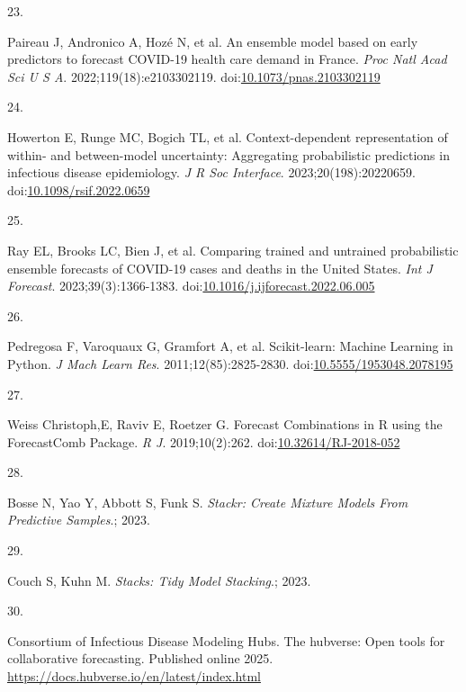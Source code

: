\documentclass[
]{article}
\newlength{\cslhangindent}
\newlength{\csllabelwidth}
\newenvironment{CSLReferences}[2] %
 {\begin{list}{}{%
  \setlength{\itemindent}{0pt}
  \setlength{\leftmargin}{0pt}
  \setlength{\parsep}{0pt}
  \ifodd #1
   \setlength{\leftmargin}{\cslhangindent}
   \setlength{\itemindent}{-1\cslhangindent}
  \fi
  \setlength{\itemsep}{#2\baselineskip}}}
 {\end{list}}
\newcommand{\CSLLeftMargin}[1]{\parbox[t]{\csllabelwidth}{\strut#1\strut}}
\newcommand{\CSLRightInline}[1]{\parbox[t]{\linewidth - \csllabelwidth}{\strut#1\strut}}
\begin{document}
\begin{CSLReferences}{0}{1}
\CSLLeftMargin{23. }%
\CSLRightInline{Paireau J, Andronico A, Hozé N, et al. An ensemble model
based on early predictors to forecast {COVID}-19 health care demand in
{France}. \emph{Proc Natl Acad Sci U S A}. 2022;119(18):e2103302119.
doi:\href{https://doi.org/10.1073/pnas.2103302119}{10.1073/pnas.2103302119}}

\CSLLeftMargin{24. }%
\CSLRightInline{Howerton E, Runge MC, Bogich TL, et al.
Context-dependent representation of within- and between-model
uncertainty: Aggregating probabilistic predictions in infectious disease
epidemiology. \emph{J R Soc Interface}. 2023;20(198):20220659.
doi:\href{https://doi.org/10.1098/rsif.2022.0659}{10.1098/rsif.2022.0659}}

\CSLLeftMargin{25. }%
\CSLRightInline{Ray EL, Brooks LC, Bien J, et al. Comparing trained and
untrained probabilistic ensemble forecasts of {COVID}-19 cases and
deaths in the {United} {States}. \emph{Int J Forecast}.
2023;39(3):1366-1383.
doi:\href{https://doi.org/10.1016/j.ijforecast.2022.06.005}{10.1016/j.ijforecast.2022.06.005}}

\CSLLeftMargin{26. }%
\CSLRightInline{Pedregosa F, Varoquaux G, Gramfort A, et al.
Scikit-learn: {Machine} {Learning} in {Python}. \emph{J Mach Learn Res}.
2011;12(85):2825-2830.
doi:\href{https://doi.org/10.5555/1953048.2078195}{10.5555/1953048.2078195}}

\CSLLeftMargin{27. }%
\CSLRightInline{Weiss Christoph,E, Raviv E, Roetzer G. Forecast
Combinations in R using the ForecastComb Package. \emph{R J}.
2019;10(2):262.
doi:\href{https://doi.org/10.32614/RJ-2018-052}{10.32614/RJ-2018-052}}

\CSLLeftMargin{28. }%
\CSLRightInline{Bosse N, Yao Y, Abbott S, Funk S. \emph{Stackr: {Create}
{Mixture} {Models} {From} {Predictive} {Samples}}.; 2023.}

\CSLLeftMargin{29. }%
\CSLRightInline{Couch S, Kuhn M. \emph{Stacks: Tidy Model Stacking}.;
2023.}

\CSLLeftMargin{30. }%
\CSLRightInline{Consortium of Infectious Disease Modeling Hubs. The
hubverse: Open tools for collaborative forecasting. Published online
2025. \url{https://docs.hubverse.io/en/latest/index.html}}


\end{CSLReferences}
\end{document}
